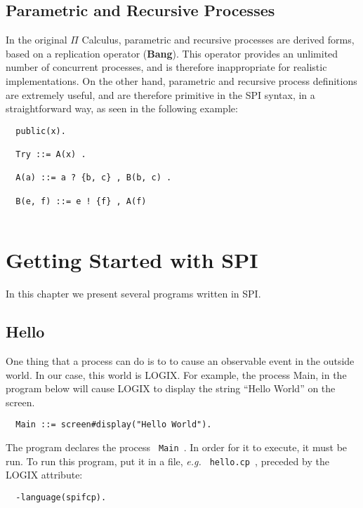 \section{Parametric and Recursive Processes}

In the original $\Pi$ Calculus, parametric and recursive processes are
derived forms, based on a replication operator ({\bf Bang}).  This operator
provides an unlimited number of concurrent processes, and is therefore
inappropriate for realistic implementations. On the other hand,
parametric and recursive process definitions are extremely useful, and
are therefore primitive in the SPI syntax, in a straightforward way,
as seen in the following example:

\begin{verbatim}
  public(x).

  Try ::= A(x) .

  A(a) ::= a ? {b, c} , B(b, c) .

  B(e, f) ::= e ! {f} , A(f) 
 
\end{verbatim}


\chapter{Getting Started with SPI}
\label{simple programs}

In this chapter we present several programs written in SPI.

\section{Hello}

One thing that a process can do is to to cause an observable
event in the outside world. In our case, this world is LOGIX.
For example, the process Main, in the program below will cause
LOGIX to display the string ``Hello World'' on the screen.

\begin{verbatim}
  Main ::= screen#display("Hello World").
\end{verbatim}

\noindent

The program declares the process \verb+ Main +. In order for it to execute,
it must be run.  To run this program, put it in a file,
{\em e.g.} \verb+ hello.cp +, preceded by the LOGIX attribute:

\begin{verbatim}
  -language(spifcp).
\end{verbatim}


